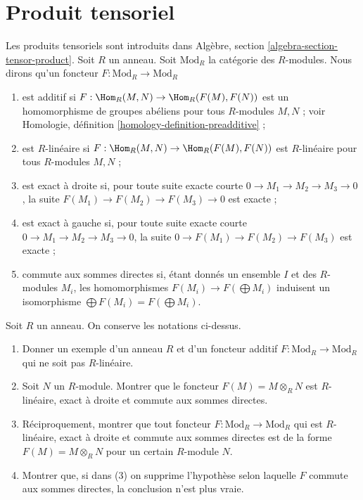 \section{Produit tensoriel}
\label{section-tensor-product}

\noindent
Les produits tensoriels sont introduits dans Algèbre, section
\ref{algebra-section-tensor-product}.
Soit $R$ un anneau. Soit $\text{Mod}_R$ la catégorie des $R$-modules.
Nous dirons qu'un foncteur $F : \text{Mod}_R \to \text{Mod}_R$
\begin{enumerate}
\item est additif si
$F : \Hom_R(M, N) \to \Hom_R(F(M), F(N))$
est un homomorphisme de groupes abéliens
pour tous $R$-modules $M, N$ ; voir
Homologie, définition \ref{homology-definition-preadditive} ;
\item est $R$-linéaire si $F : \Hom_R(M, N) \to \Hom_R(F(M), F(N))$ est $R$-linéaire
pour tous $R$-modules $M, N$ ;
\item est exact à droite si, pour toute suite exacte courte
$0 \to M_1 \to M_2 \to M_3 \to 0$, la suite
$F(M_1) \to F(M_2) \to F(M_3) \to 0$ est exacte ;
\item est exact à gauche si, pour toute suite exacte courte
$0 \to M_1 \to M_2 \to M_3 \to 0$, la suite
$0 \to F(M_1) \to F(M_2) \to F(M_3)$ est exacte ;
\item commute aux sommes directes si, étant donnés un ensemble
$I$ et des $R$-modules $M_i$, les homomorphismes
$F(M_i) \to F(\bigoplus M_i)$ induisent un isomorphisme
$\bigoplus F(M_i) = F(\bigoplus M_i)$.
\end{enumerate}

\begin{exercise}
\label{exercise-characterize-tensor-functor}
Soit $R$ un anneau. On conserve les notations ci-dessus.
\begin{enumerate}
\item Donner un exemple d'un anneau $R$ et d'un foncteur additif
$F : \text{Mod}_R \to \text{Mod}_R$ qui ne soit pas $R$-linéaire.
\item Soit $N$ un $R$-module. Montrer que le foncteur
$F(M) = M \otimes_R N$ est $R$-linéaire,
exact à droite et commute aux sommes directes.
\item Réciproquement, montrer que tout foncteur $F : \text{Mod}_R \to \text{Mod}_R$
qui est $R$-linéaire,
exact à droite et commute aux sommes directes est de la
forme $F(M) = M \otimes_R N$ pour un certain $R$-module $N$.
\item Montrer que, si dans (3) on supprime l'hypothèse
selon laquelle $F$ commute aux sommes directes, la conclusion n'est
plus vraie.
\end{enumerate}
\end{exercise}





